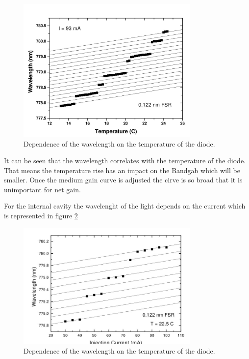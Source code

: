 \begin{figure}[H]
    \centering
    \includegraphics[width=0.8\textwidth]{content/graphics/wavelenghttotemperature.jpg}
    \caption{Dependence of the wavelength on the temperature of the diode.} %
    \label{fig:temp}
\end{figure}

It can be seen that the wavelength correlates with the temperature of the diode.
That means the temperature rise has an impact on the Bandgab which will be smaller.
Once the medium gain curve is adjusted the cirve is so broad that it is unimportant for net gain.

For the internal cavity the wavelenght of the light depends on the current which is represented in figure \ref{fig:cur}

\begin{figure}[H]
    \centering
    \includegraphics[width=0.8\textwidth]{content/graphics/current.jpg}
    \caption{Dependence of the wavelength on the temperature of the diode.} %
    \label{fig:cur}
\end{figure}
